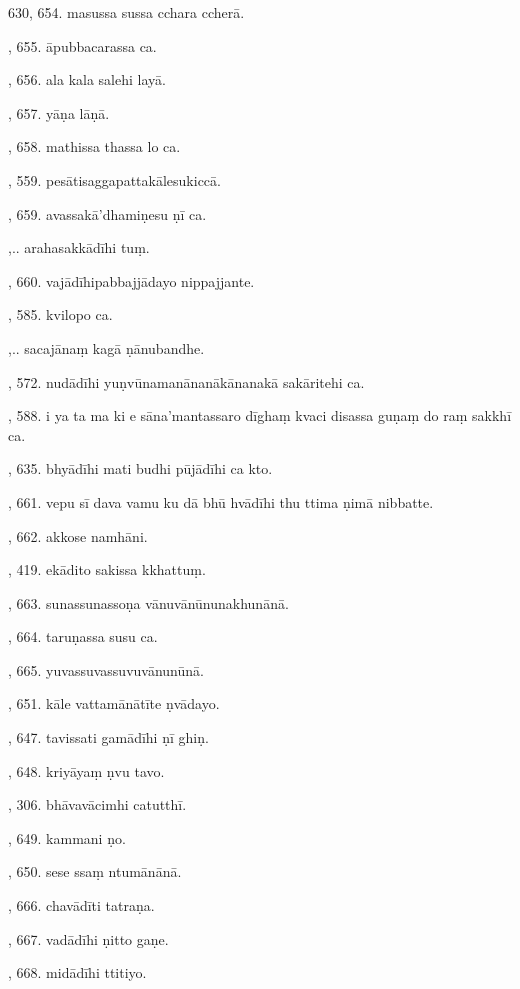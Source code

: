 630, 654. masussa sussa cchara ccherā.\par {}, 655. āpubbacarassa ca.\par {}, 656. ala kala salehi layā.\par {}, 657. yāṇa lāṇā.\par {}, 658. mathissa thassa lo ca.\par {}, 559. pesātisaggapattakālesukiccā.\par {}, 659. avassakā’dhamiṇesu ṇī ca.\par {},.. arahasakkādīhi tuṃ.\par {}, 660. vajādīhipabbajjādayo nippajjante.\par {}, 585. kvilopo ca.\par {},.. sacajānaṃ kagā ṇānubandhe.\par {}, 572. nudādīhi yuṇvūnamanānanākānanakā sakāritehi ca.\par {}, 588. i ya ta ma ki e sāna’mantassaro dīghaṃ kvaci disassa guṇaṃ do raṃ sakkhī ca.\par {}, 635. bhyādīhi mati budhi pūjādīhi ca kto.\par {}, 661. vepu sī dava vamu ku dā bhū hvādīhi thu ttima ṇimā nibbatte.\par {}, 662. akkose namhāni.\par {}, 419. ekādito sakissa kkhattuṃ.\par {}, 663. sunassunassoṇa vānuvānūnunakhunānā.\par {}, 664. taruṇassa susu ca.\par {}, 665. yuvassuvassuvuvānunūnā.\par {}, 651. kāle vattamānātīte ṇvādayo.\par {}, 647. tavissati gamādīhi ṇī ghiṇ.\par {}, 648. kriyāyaṃ ṇvu tavo.\par {}, 306. bhāvavācimhi catutthī.\par {}, 649. kammani ṇo.\par {}, 650. sese ssaṃ ntumānānā.\par {}, 666. chavādīti tatraṇa.\par {}, 667. vadādīhi ṇitto gaṇe.\par {}, 668. midādīhi ttitiyo.\par \noindent
